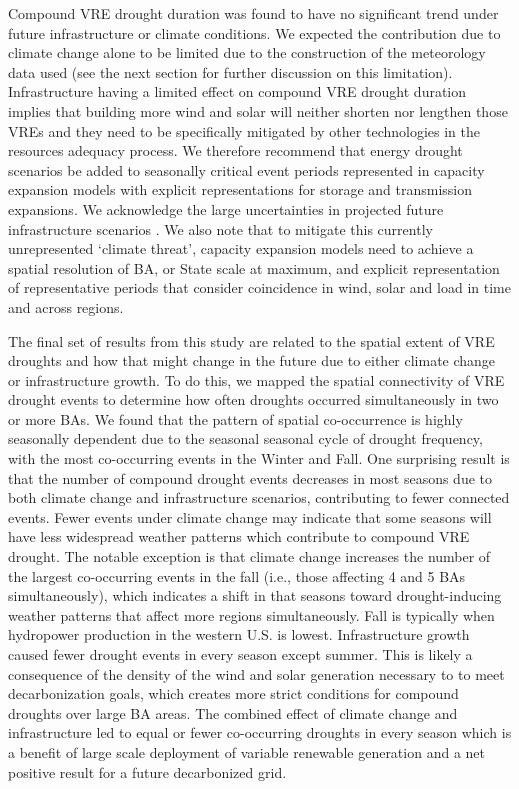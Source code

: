 \documentclass{agujournal2019}
\begin{document}
Compound VRE drought duration was found to have no significant trend under future infrastructure or climate conditions. We expected the contribution due to climate change alone to be limited due to the construction of the meteorology data used (see the next section for further discussion on this limitation). Infrastructure having a limited effect on compound VRE drought duration implies that building more wind and solar will neither shorten nor lengthen those VREs and they need to be specifically mitigated by other technologies in the resources adequacy process. We therefore recommend that energy drought scenarios be added to seasonally critical event periods represented in capacity expansion models with explicit representations for storage and transmission expansions. We acknowledge the large uncertainties in projected future infrastructure scenarios \cite{Browning_2023}. We also note that to mitigate this currently unrepresented `climate threat', capacity expansion models need to achieve a spatial resolution of BA, or State scale at maximum, and explicit representation of representative periods that consider coincidence in wind, solar and load in time and across regions. 

The final set of results from this study are related to the spatial extent of VRE droughts and how that might change in the future due to either climate change or infrastructure growth. To do this, we mapped the spatial connectivity of VRE drought events to determine how often droughts occurred simultaneously in two or more BAs. We found that the pattern of spatial co-occurrence is highly seasonally dependent due to the seasonal seasonal cycle of drought frequency, with the most co-occurring events in the Winter and Fall. One surprising result is that the number of compound drought events decreases in most seasons due to both climate change and infrastructure scenarios, contributing to fewer connected events. Fewer events under climate change may indicate that some seasons will have less widespread weather patterns which contribute to compound VRE drought. The notable exception is that climate change increases the number of the largest co-occurring events in the fall (i.e., those affecting 4 and 5 BAs simultaneously), which indicates a shift in that seasons toward drought-inducing weather patterns that affect more regions simultaneously. Fall is typically when hydropower production in the western U.S. is lowest. Infrastructure growth caused fewer drought events in every season except summer. This is likely a consequence of the density of the wind and solar generation necessary to to meet decarbonization goals, which creates more strict conditions for compound droughts over large BA areas. The combined effect of climate change and infrastructure led to equal or fewer co-occurring droughts in every season which is a benefit of large scale deployment of variable renewable generation and a net positive result for a future decarbonized grid.
\end{document}
